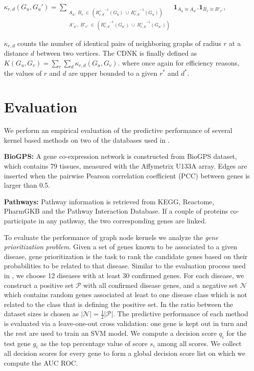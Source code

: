 \documentclass{esannV2}
\begin{document}
\begin{center}
 $\kappa_{r,d}(G_u,G_u') = \!\!\!\!\!\!\!\!\!\!\!\! \sum\limits_{\substack
 {A_u,\ {B}_{v} \ \in \ ({R_{r,d}^{\wedge}}^{ -1}(G_u)\ \cup\  {R_{r,d}^{\vee}}^{ -1}(G_u)) \\
  A'_{u'},\ {B'}_{v'} \ \in \ ({R_{r,d}^{\wedge}}^{ -1}(G_{u'})\ \cup\  {R_{r,d}^{\vee}}^{ -1}(G_{u'})) }} \!\!\!\!\!\!\!\!\!\!\!\!
  { \textbf{1}_{A_u \cong A_{u'}}.{ \textbf{1}_{B_{v} \cong B'_{v'}}}}$,
\end{center}
$\kappa_{r,d}$ counts the number of identical pairs of neighboring graphs of radius $r$ at a distance $d$ between two vertices. The CDNK is finally defined as 
$K(G_u,G_v) = \sum\limits_{r}{\sum\limits_{d}{\kappa_{r,d}(G_u,G_v)}}.$
where once again for efficiency reasons,
the values of $r$ and $d$ are upper bounded to a given $r^*$ and $d^*$.

\section{Evaluation}
\label{evaluation}
We perform an empirical evaluation of the predictive performance of several kernel based methods on two of the databases used in \cite{medk}.

\textbf{BioGPS:} A gene co-expression network is constructed from BioGPS dataset, which contains 79 tissues, measured with the Affymetrix U133A array. Edges are inserted when the pairwise Pearson correlation coefficient (PCC) between genes is larger than 0.5.

\textbf{Pathways:} Pathway information is retrieved from KEGG, Reactome, PharmGKB and the Pathway Interaction Database. If a couple of proteins co-participate in any pathway, the two corresponding genes are linked.  

To evaluate the performance of graph node kernels we analyze the {\em gene
prioritization problem}. Given a set of genes known to be associated to a
given disease, gene prioritization is the task to rank the candidate genes
based on their probabilities to be related to that disease. Similar to the
evaluation process used in \cite{medk}, we choose 12 diseases with at least 30
confirmed genes. For each disease, we construct a positive set $\mathcal{P}$
with all confirmed disease genes, and a negative set $\mathcal{N}$ which
contains random genes associated at least to one disease class which is not
related to the class that is defining the positive set. In \cite{medk} the
ratio between the dataset sizes is chosen as $\vert \mathcal{N} \vert =
\frac{1}{2} \vert \mathcal{P} \vert$. 
The predictive performance of each method is evaluated via a leave-one-out
cross validation: one gene is kept out in turn and the rest
are used to train an SVM model. 
We compute a decision score $q_i$ for the
test gene $g_i$ as the top percentage value of score $s_i$ among all scores.
We collect all decision scores for every gene to
form a global decision score list on which we compute the AUC ROC.
\end{document}
